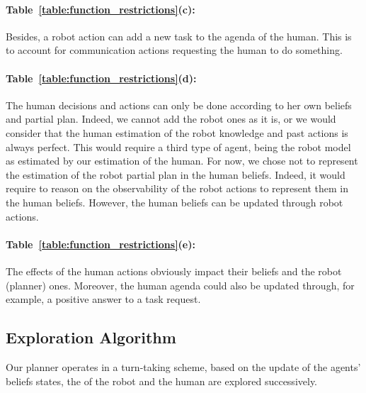 \documentclass[a4paper,11pt,twoside]{StyleThese}
\begin{document}
\paragraph{Table~\ref{table:function_restrictions}(c):} Besides, a robot action can add a new task to the agenda of the human. This is to account for communication actions requesting the human to do something.

\paragraph{Table~\ref{table:function_restrictions}(d):} The human decisions and actions can only be done according to her own beliefs and partial plan. Indeed, we cannot add the robot ones as it is, or we would consider that the human estimation of the robot knowledge and past actions is always perfect. This would require a third type of agent, being the robot model as estimated by our estimation of the human. For now, we chose not to represent the estimation of the robot partial plan in the human beliefs. Indeed, it would require to reason on the observability of the robot actions to represent them in the human beliefs. However, the human beliefs can be updated through robot actions.

\paragraph{Table~\ref{table:function_restrictions}(e):} The effects of the human actions obviously impact their beliefs and the robot (planner) ones. Moreover, the human agenda could also be updated through, for example, a positive answer to a task request.


\subsection{Exploration Algorithm}
Our planner operates in a turn-taking scheme, based on the update of the agents' beliefs states, the  of the robot and the human are explored successively.
\end{document}
